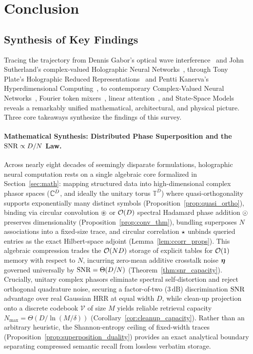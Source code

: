 \section{Conclusion}\label{sec:conclusion}

\subsection{Synthesis of Key Findings}\label{sec:conclusion:synthesis}

Tracing the trajectory from Dennis Gabor's optical wave interference~\cite{GABOR_1948_HOLOGRAPHY} and John Sutherland's complex-valued Holographic Neural Networks~\cite{SUTHERLAND_1990_HNN}, through Tony Plate's Holographic Reduced Representations~\cite{PLATE_1995_HRR} and Pentti Kanerva's Hyperdimensional Computing~\cite{KANERVA_2009_HDC}, to contemporary Complex-Valued Neural Networks~\cite{BASSEY_CVNN_SURVEY}, Fourier token mixers~\cite{LEE_THORP_FNET}, linear attention~\cite{KATHAROPOULOS_2020_LINEAR_TRANSFORMER}, and State-Space Models~\cite{GU_SSM_S4_MAMBA} reveals a remarkably unified mathematical, architectural, and physical picture.
Three core takeaways synthesize the findings of this survey.

\paragraph{Mathematical Synthesis: Distributed Phase Superposition and the $\mathrm{SNR} \propto D/N$ Law.}
Across nearly eight decades of seemingly disparate formulations, holographic neural computation rests on a single algebraic core formalized in Section~\ref{sec:math}: mapping structured data into high-dimensional complex phasor spaces ($\mathbb{C}^D$, and ideally the unitary torus $\mathbb{T}^D$) where quasi-orthogonality supports exponentially many distinct symbols (Proposition~\ref{prop:quasi_ortho}), binding via circular convolution $\circledast$ or $\mathcal{O}\!\left(D\right)$ spectral Hadamard phase addition $\odot$ preserves dimensionality (Proposition~\ref{prop:conv_thm}), bundling superposes $N$ associations into a fixed-size trace, and circular correlation $\star$ unbinds queried entries as the exact Hilbert-space adjoint (Lemma~\ref{lem:ccorr_props}).
This algebraic compression trades the $\mathcal{O}\!\left(ND\right)$ storage of explicit tables for $\mathcal{O}\!\left(1\right)$ memory with respect to $N$, incurring zero-mean additive crosstalk noise $\boldsymbol{\eta}$ governed universally by $\mathrm{SNR} = \Theta(D/N)$ (Theorem~\ref{thm:snr_capacity}).
Crucially, unitary complex phasors eliminate spectral self-distortion and reject orthogonal quadrature noise, securing a factor-of-two ($3\,\mathrm{dB}$) discrimination $\mathrm{SNR}$ advantage over real Gaussian HRR at equal width $D$, while clean-up projection onto a discrete codebook $\mathcal{V}$ of size $M$ yields reliable retrieval capacity $N_{\max} = \Theta(D / \ln(M/\delta))$ (Corollary~\ref{cor:cleanup_capacity}).
Rather than an arbitrary heuristic, the Shannon-entropy ceiling of fixed-width traces (Proposition~\ref{prop:superposition_duality}) provides an exact analytical boundary separating compressed semantic recall from lossless verbatim storage.

